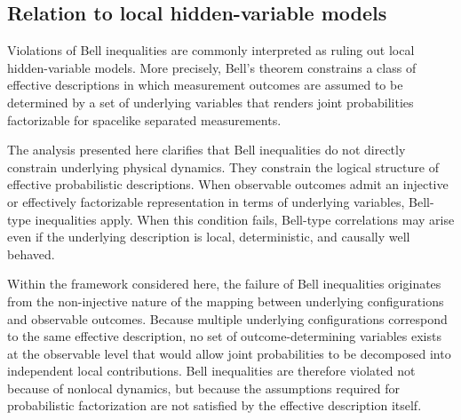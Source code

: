 \subsection{Relation to local hidden-variable models}
  \label{subsec:lhv-relation}

  Violations of Bell inequalities are commonly interpreted as ruling out local
  hidden-variable models.
  More precisely, Bell’s theorem constrains a class of effective descriptions in which
  measurement outcomes are assumed to be determined by a set of underlying variables
  that renders joint probabilities factorizable for spacelike separated measurements.

  The analysis presented here clarifies that Bell inequalities do not directly constrain
  underlying physical dynamics.
  They constrain the logical structure of effective probabilistic descriptions.
  When observable outcomes admit an injective or effectively factorizable representation
  in terms of underlying variables, Bell-type inequalities apply.
  When this condition fails, Bell-type correlations may arise even if the underlying
  description is local, deterministic, and causally well behaved.

  Within the framework considered here, the failure of Bell inequalities originates
  from the non-injective nature of the mapping between underlying configurations and
  observable outcomes.
  Because multiple underlying configurations correspond to the same effective
  description, no set of outcome-determining variables exists at the observable level
  that would allow joint probabilities to be decomposed into independent local
  contributions.
  Bell inequalities are therefore violated not because of nonlocal dynamics, but
  because the assumptions required for probabilistic factorization are not satisfied
  by the effective description itself.
